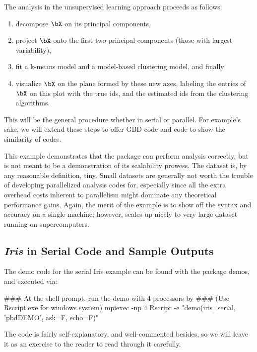 The analysis in the unsupervised learning approach proceeds as follows:
\begin{enumerate}
\item decompose $\bX$ on its principal components,
\item project $\bX$ onto the first two principal components
      (those with largest variability),
\item fit a k-means model and a model-based clustering model, and finally
\item visualize $\bX$ on the plane formed by these new axes, labeling the
      entries of $\bX$ on this plot with the true ids, and the estimated
      ids from the clustering algorithms.
\end{enumerate}
This will be the general procedure whether in serial or parallel.
For example's sake, we will extend these steps
to offer GBD code and  code to show the similarity of codes.

This example demonstrates that the
 package
can perform analysis correctly, but is not
meant to be a demonstration of its scalability prowess.
The  dataset is, by any reasonable definition, tiny.
Small datasets are generally not worth the trouble of developing
parallelized analysis codes for, especially since all the extra
overhead costs inherent to parallelism might dominate any theoretical
performance gains. Again, the merit of the example is to show off
the syntax and accuracy on a single machine; however, 
scales up nicely to very large dataset running on supercomputers.



\subsection{{\it Iris} in Serial Code and Sample Outputs}

The demo code for the serial Iris example can be found with the package
demos, and executed via:
\begin{Command}
### At the shell prompt, run the demo with 4 processors by
### (Use Rscript.exe for windows system)
mpiexec -np 4 Rscript -e "demo(iris_serial, 'pbdDEMO', ask=F, echo=F)"
\end{Command}

The code is fairly self-explanatory, and well-commented besides, so we will
leave it as an exercise to the reader to read through it carefully.

